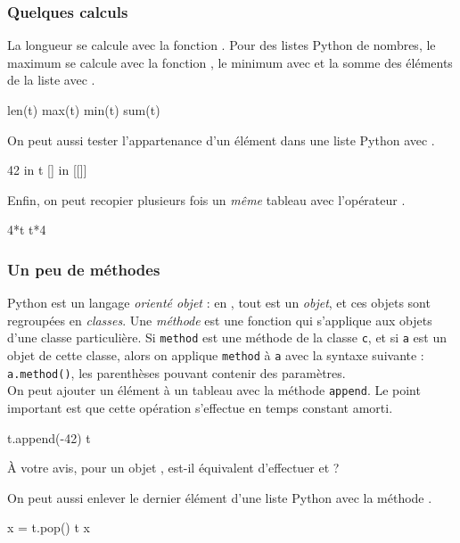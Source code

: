 \subsubsection{Quelques calculs}
La longueur se calcule avec la fonction . Pour des listes Python de nombres, le maximum 
se calcule avec la fonction , le minimum avec  et la somme des éléments de la 
liste avec .
\begin{pyconsole}
len(t)
max(t)
min(t)
sum(t)
\end{pyconsole}

On peut aussi tester l'appartenance d'un élément dans une liste Python avec .

\begin{pyconsole}
42 in t
[] in [[]]
\end{pyconsole}

Enfin, on peut recopier plusieurs fois un \emph{même} tableau avec l'opérateur \pyv{*}.

\begin{pyconsole}
4*t
t*4
\end{pyconsole}


\subsubsection{Un peu de méthodes}
Python est un langage \emph{orienté objet} : en \python, tout est un \emph{objet}, et ces objets 
sont regroupées en \emph{classes}. Une \emph{méthode} est une fonction qui s'applique aux objets 
d'une classe particulière. Si \texttt{method} est une méthode de la classe \texttt{c}, et si 
\texttt{a} est un objet de cette classe, alors on applique \texttt{method} à \texttt{a} avec la 
syntaxe suivante : \texttt{a.method()}, les parenthèses pouvant contenir des paramètres.\\

On peut ajouter un élément à un tableau avec la méthode \texttt{append}. Le point important est que 
cette opération s'effectue en temps constant amorti.
\begin{pyconsole}
t.append(-42)
t
\end{pyconsole}
\`A votre avis, pour un objet , est-il équivalent d'effectuer  et  ?

On peut aussi enlever le dernier élément d'une liste Python avec la méthode .
\begin{pyconsole}
x = t.pop()
t
x
\end{pyconsole}

